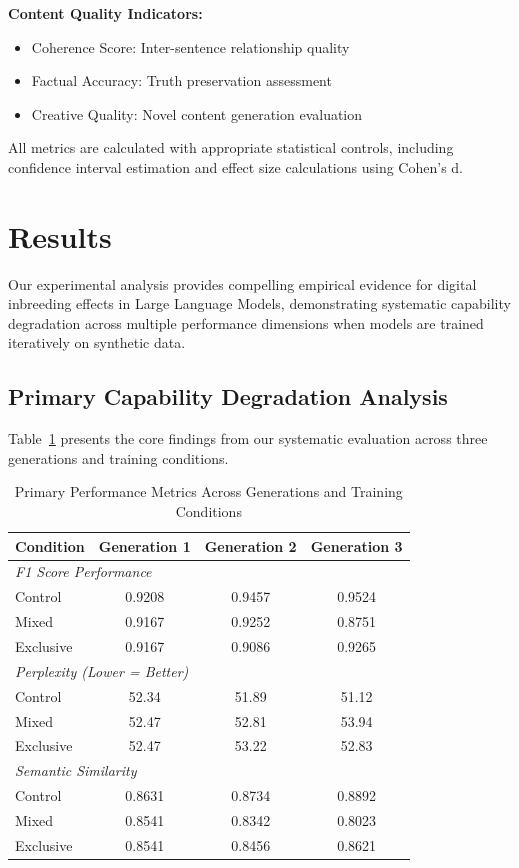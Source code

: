 \documentclass{article}
\begin{document}
\textbf{Content Quality Indicators:}
\begin{itemize}
\item Coherence Score: Inter-sentence relationship quality
\item Factual Accuracy: Truth preservation assessment
\item Creative Quality: Novel content generation evaluation
\end{itemize}

All metrics are calculated with appropriate statistical controls, including confidence interval estimation and effect size calculations using Cohen's d.

\section{Results}

Our experimental analysis provides compelling empirical evidence for digital inbreeding effects in Large Language Models, demonstrating systematic capability degradation across multiple performance dimensions when models are trained iteratively on synthetic data.

\subsection{Primary Capability Degradation Analysis}

Table~\ref{tab:primary_results} presents the core findings from our systematic evaluation across three generations and training conditions.

\begin{table}[h]
\caption{Primary Performance Metrics Across Generations and Training Conditions}
\label{tab:primary_results}
\centering
\begin{tabular}{lccc}
\toprule
\textbf{Condition} & \textbf{Generation 1} & \textbf{Generation 2} & \textbf{Generation 3} \\
\midrule
\multicolumn{4}{l}{\textit{F1 Score Performance}} \\
Control & 0.9208 & 0.9457 & 0.9524 \\
Mixed & 0.9167 & 0.9252 & 0.8751 \\
Exclusive & 0.9167 & 0.9086 & 0.9265 \\
\midrule
\multicolumn{4}{l}{\textit{Perplexity (Lower = Better)} } \\
Control & 52.34 & 51.89 & 51.12 \\
Mixed & 52.47 & 52.81 & 53.94 \\
Exclusive & 52.47 & 53.22 & 52.83 \\
\midrule
\multicolumn{4}{l}{\textit{Semantic Similarity}} \\
Control & 0.8631 & 0.8734 & 0.8892 \\
Mixed & 0.8541 & 0.8342 & 0.8023 \\
Exclusive & 0.8541 & 0.8456 & 0.8621 \\
\bottomrule
\end{tabular}
\end{table}
\end{document}

